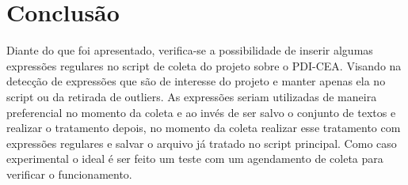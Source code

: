 \documentclass[a4paper]{article}
\begin{document}
\section{Conclusão}
Diante do que foi apresentado, verifica-se a possibilidade de inserir algumas expressões regulares no script de coleta do projeto sobre o PDI-CEA. Visando na detecção de expressões que são de interesse do projeto e manter apenas ela no script ou da retirada de outliers.
As expressões seriam utilizadas de maneira preferencial no momento da coleta e ao invés de ser salvo o conjunto de textos e realizar o tratamento depois, no momento da coleta realizar esse tratamento com expressões regulares e salvar o arquivo já tratado no script principal.
Como caso experimental o ideal é ser feito um teste com um agendamento de coleta para verificar o funcionamento.
\bigskip
\end{document}

